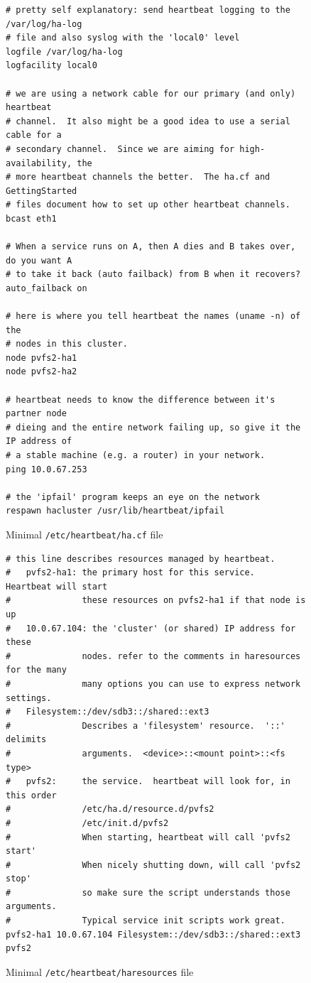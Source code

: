 \documentclass[11pt]{article}
\begin{document}
\begin{figure}
\begin{scriptsize}
\begin{verbatim}
# pretty self explanatory: send heartbeat logging to the /var/log/ha-log
# file and also syslog with the 'local0' level
logfile /var/log/ha-log
logfacility local0

# we are using a network cable for our primary (and only) heartbeat
# channel.  It also might be a good idea to use a serial cable for a
# secondary channel.  Since we are aiming for high-availability, the
# more heartbeat channels the better.  The ha.cf and GettingStarted
# files document how to set up other heartbeat channels.
bcast eth1

# When a service runs on A, then A dies and B takes over, do you want A
# to take it back (auto failback) from B when it recovers?  
auto_failback on

# here is where you tell heartbeat the names (uname -n) of the
# nodes in this cluster.
node pvfs2-ha1
node pvfs2-ha2

# heartbeat needs to know the difference between it's partner node
# dieing and the entire network failing up, so give it the IP address of
# a stable machine (e.g. a router) in your network.
ping 10.0.67.253

# the 'ipfail' program keeps an eye on the network
respawn hacluster /usr/lib/heartbeat/ipfail
\end{verbatim}
\end{scriptsize}
\caption{Minimal \texttt{/etc/heartbeat/ha.cf} file}
\label{fig:haconfig}
\end{figure}


\begin{figure}
\begin{scriptsize}
\begin{verbatim}
# this line describes resources managed by heartbeat.  
#   pvfs2-ha1: the primary host for this service.  Heartbeat will start
#              these resources on pvfs2-ha1 if that node is up
#   10.0.67.104: the 'cluster' (or shared) IP address for these
#              nodes. refer to the comments in haresources for the many
#              many options you can use to express network settings. 
#   Filesystem::/dev/sdb3::/shared::ext3
#              Describes a 'filesystem' resource.  '::' delimits
#              arguments.  <device>::<mount point>::<fs type>
#   pvfs2:     the service.  heartbeat will look for, in this order
#              /etc/ha.d/resource.d/pvfs2 
#              /etc/init.d/pvfs2
#              When starting, heartbeat will call 'pvfs2 start'
#              When nicely shutting down, will call 'pvfs2 stop'
#              so make sure the script understands those arguments.
#              Typical service init scripts work great.
pvfs2-ha1 10.0.67.104 Filesystem::/dev/sdb3::/shared::ext3 pvfs2
\end{verbatim}
\end{scriptsize}
\caption{Minimal \texttt{/etc/heartbeat/haresources} file}
\label{fig:haresources}
\end{figure}
\end{document}
